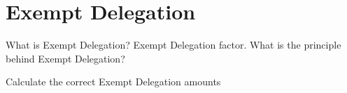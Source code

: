 \section{Exempt Delegation}

What is Exempt Delegation? Exempt Delegation factor.
What is the principle behind Exempt Delegation?

Calculate the correct Exempt Delegation amounts
